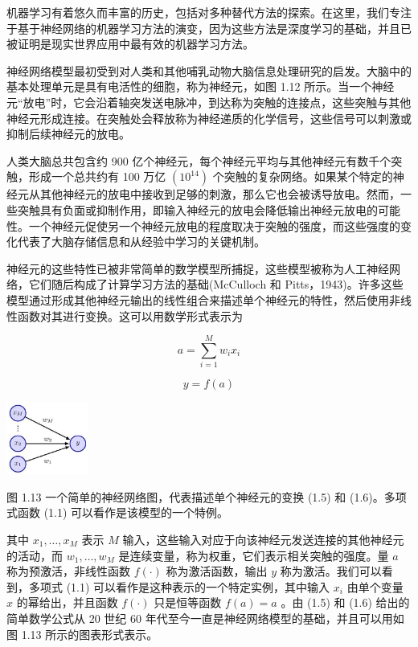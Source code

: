 \documentclass[10pt]{article}
\begin{document}
机器学习有着悠久而丰富的历史，包括对多种替代方法的探索。在这里，我们专注于基于神经网络的机器学习方法的演变，因为这些方法是深度学习的基础，并且已被证明是现实世界应用中最有效的机器学习方法。

神经网络模型最初受到对人类和其他哺乳动物大脑信息处理研究的启发。大脑中的基本处理单元是具有电活性的细胞，称为神经元，如图 1.12 所示。当一个神经元“放电”时，它会沿着轴突发送电脉冲，到达称为突触的连接点，这些突触与其他神经元形成连接。在突触处会释放称为神经递质的化学信号，这些信号可以刺激或抑制后续神经元的放电。

人类大脑总共包含约 900 亿个神经元，每个神经元平均与其他神经元有数千个突触，形成一个总共约有 100 万亿 \(\left( {10}^{14}\right)\) 个突触的复杂网络。如果某个特定的神经元从其他神经元的放电中接收到足够的刺激，那么它也会被诱导放电。然而，一些突触具有负面或抑制作用，即输入神经元的放电会降低输出神经元放电的可能性。一个神经元促使另一个神经元放电的程度取决于突触的强度，而这些强度的变化代表了大脑存储信息和从经验中学习的关键机制。

神经元的这些特性已被非常简单的数学模型所捕捉，这些模型被称为人工神经网络，它们随后构成了计算学习方法的基础(McCulloch 和 Pitts，1943)。许多这些模型通过形成其他神经元输出的线性组合来描述单个神经元的特性，然后使用非线性函数对其进行变换。这可以用数学形式表示为

\[
a = \mathop{\sum }\limits_{{i = 1}}^{M}{w}_{i}{x}_{i} \tag{1.5}
\]

\[
y = f\left( a\right)  \tag{1.6}
\]

\begin{center}
\includegraphics[max width=0.2\textwidth]{images/0194e279-9b28-703a-88f4-c3ac21e2010d_36_1225_345_326_291_0.jpg}
\end{center}
\hspace*{3em} 

图 1.13 一个简单的神经网络图，代表描述单个神经元的变换 (1.5) 和 (1.6)。多项式函数 (1.1) 可以看作是该模型的一个特例。

其中 \({x}_{1},\ldots ,{x}_{M}\) 表示 \(M\) 输入，这些输入对应于向该神经元发送连接的其他神经元的活动，而 \({w}_{1},\ldots ,{w}_{M}\) 是连续变量，称为权重，它们表示相关突触的强度。量 \(a\) 称为预激活，非线性函数 \(f\left( \cdot \right)\) 称为激活函数，输出 \(y\) 称为激活。我们可以看到，多项式 (1.1) 可以看作是这种表示的一个特定实例，其中输入 \({x}_{i}\) 由单个变量 \(x\) 的幂给出，并且函数 \(f\left( \cdot \right)\) 只是恒等函数 \(f\left( a\right)  = a\) 。由 (1.5) 和 (1.6) 给出的简单数学公式从 20 世纪 60 年代至今一直是神经网络模型的基础，并且可以用如图 1.13 所示的图表形式表示。
\end{document}
